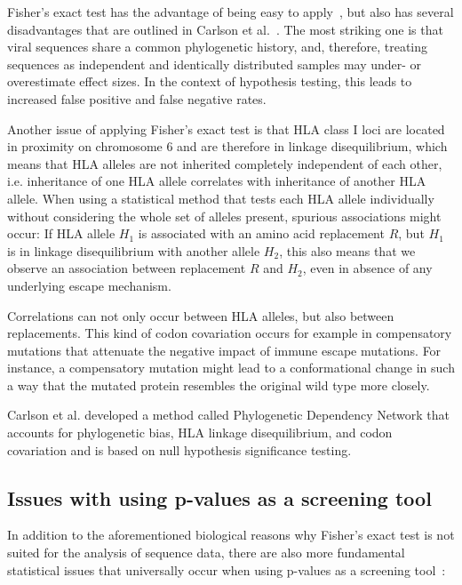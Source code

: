 \documentclass[fleqn,11pt]{SelfArx} %
\begin{document}
Fisher's exact test has the advantage of being easy to apply~\cite{Budeus2016},  but also has several disadvantages that are outlined in Carlson et al.~\cite{Carlson2008}. The most striking one is that viral sequences share a common phylogenetic history, and,  therefore, treating sequences as independent and identically distributed samples may under- or overestimate effect sizes. In the context of hypothesis testing, this leads to increased false positive and false negative rates. 

Another issue of applying Fisher's exact test is that HLA class I loci are located in proximity on chromosome 6 and are therefore in linkage disequilibrium, which means that HLA alleles are not inherited completely independent of each other, i.e. inheritance of one HLA allele correlates with inheritance of another HLA allele. When using a statistical method that tests each HLA allele individually without considering the whole set of alleles present, spurious associations might occur: If HLA allele \(H_{1}\) is associated with an amino acid replacement \(R\), but \(H_{1}\) is in linkage disequilibrium with another allele \(H_{2}\), this also means that we observe an association between replacement \(R\) and \(H_{2}\), even in absence of any underlying escape mechanism.

Correlations can not only occur between HLA alleles, but also between replacements. This kind of codon covariation occurs for example in compensatory mutations that attenuate the negative impact of immune escape mutations. For instance, a compensatory mutation might lead to a conformational change in such a way that the mutated protein resembles the original wild type more closely.

Carlson et al. \nolinebreak\cite{Carlson2008} developed a method called  Phylogenetic Dependency Network that accounts for phylogenetic bias,  HLA linkage disequilibrium, and codon covariation and is based on null hypothesis significance testing.

\subsection{Issues with using p-values as a screening tool}

In addition to the aforementioned biological reasons why Fisher's exact test is  not suited for the analysis of sequence data, there are also more fundamental statistical issues that universally occur when using p-values as a screening tool~\cite{Amrhein2017}:
\end{document}
